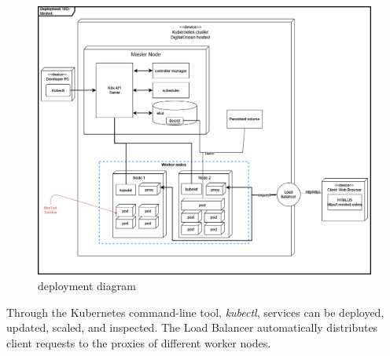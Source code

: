 \begin{figure}[H]
    \centering
    \includegraphics[scale=0.418]{images/deployment_diagrams/devopsdiagrams-deployment k8s.drawio(1).png}
    \caption{\mini deployment diagram}
    \label{fig:figdeploy}
\end{figure}
Through the Kubernetes command-line tool, \textit{kubectl}, services can be deployed, updated, scaled, and inspected. The Load Balancer automatically distributes client requests to the proxies of different worker nodes.

